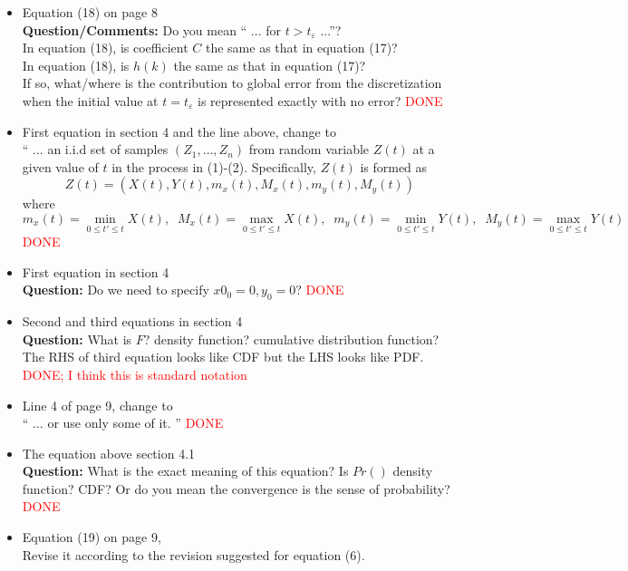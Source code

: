 \documentclass[12pt]{article}
\begin{document}
\begin{itemize}
\item Equation (18) on page 8 \\
  {\bf Question/Comments:} Do you mean
  `` ... for $t > t_{\varepsilon}$ ...''? \\
  In equation (18), is coefficient $C$ the same as that in equation (17)? \\
  In equation (18), is $h(k)$ the same as that in equation (17)? \\
  If so, what/where is the contribution to global error from the
  discretization when the initial value at $t=t_{\varepsilon} $ is
  represented exactly with no error?  \textcolor{red}{DONE}

\item First equation in section 4 and the line above, change to  \\
`` ... an i.i.d set of samples $(Z_1, \ldots, Z_n)$ from random variable $Z(t)$ at a given 
value of $t$ in the process in (1)-(2). Specifically, $Z(t)$ is formed as 
$$ Z(t) =( X(t), Y(t), m_x(t), M_x(t), m_y(t), M_y(t)) $$
where 
$$m_x(t)= \min_{0 \le t' \le t} X(t), \;\; 
M_x(t)= \max_{0 \le t' \le t} X(t), \;\; 
m_y(t)= \min_{0 \le t' \le t} Y(t), \;\; 
M_y(t)= \max_{0 \le t' \le t} Y(t) $$
\textcolor{red}{DONE}

\item First equation in section 4 \\
  {\bf Question:} Do we need to specify $x0_0=0, y_0=0$?
  \textcolor{red}{DONE}

\item Second and third equations in section 4 \\
{\bf Question:} What is $F$? density function? cumulative distribution function? \\
The RHS of third equation looks like CDF but the LHS looks like PDF.
  \textcolor{red}{DONE; I think this is standard notation} 

\item Line 4 of page 9, change to \\
  `` ... or use only some of it. ''
    \textcolor{red}{DONE}

\item The equation above section 4.1 \\
{\bf Question:} What is the exact meaning of this equation? 
Is $Pr()$ density function? CDF? 
Or do you mean the convergence is the sense of probability?
    \textcolor{red}{DONE}

\item Equation (19) on page 9, \\
Revise it according to the revision suggested for equation (6). 


\end{itemize}
\end{document}
